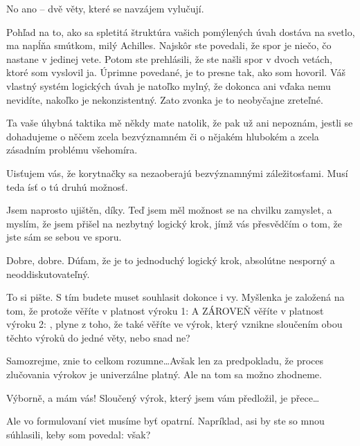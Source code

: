 \documentclass[12pt]{article}
\begin{document}
\begin{description}[itemsep=0pt]
\item[A:] No ano -- dvě věty, které se navzájem vylučují.

\item[Ž:] Pohľad na to, ako sa spletitá štruktúra vašich pomýlených úvah dostáva na 
    svetlo, ma napĺňa smútkom, milý Achilles. Najskôr ste povedali, že spor je niečo, 
    čo nastane v jedinej vete. Potom ste prehlásili, že ste našli spor v dvoch vetách, 
    ktoré som vyslovil ja. Úprimne povedané, je to presne tak, ako som hovoril. 
    Váš vlastný systém logických úvah je natoľko mylný, že dokonca ani vďaka nemu 
    nevidíte, nakoľko je nekonzistentný. Zato zvonka je to neobyčajne zreteľné.

\item[A:] Ta vaše úhybná taktika mě někdy mate natolik, že pak už ani nepoznám,
    jestli se dohadujeme o něčem zcela bezvýznamném či o nějakém hlubokém a zcela
    zásadním problému všehomíra.

\item[Ž:] Uisťujem vás, že korytnačky sa nezaoberajú bezvýznamnými záležitosťami. 
    Musí teda ísť o tú druhú možnosť. 

\item[A:] Jsem naprosto ujištěn, díky. Teď jsem měl možnost se na chvilku
    zamyslet, a myslím, že jsem přišel na nezbytný logický krok, jímž
    vás přesvědčím o tom, že jste sám se sebou ve sporu.

\item[Ž:] Dobre, dobre. Dúfam, že je to jednoduchý logický krok, absolútne 
    nesporný a neoddiskutovateľný.

\item[A:] To si pište. S tím budete muset souhlasit dokonce i vy. Myšlenka
    je založená na tom, že protože věříte v platnost výroku 1:  A ZÁROVEŇ věříte v platnost výroku 2: ,
    plyne z toho, že také věříte ve výrok, který vznikne sloučením obou těchto
    výroků do jedné věty, nebo snad ne?

\item[Ž:] Samozrejme, znie to celkom rozumne\dots Avšak len za predpokladu, 
    že proces zlučovania výrokov je univerzálne platný. Ale na tom sa možno zhodneme.

\item[A:] Výborně, a mám vás! Sloučený výrok, který jsem vám předložil,
    je přece…

\item[Ž:] Ale vo formulovaní viet musíme byť opatrní. Napríklad, asi by ste so 
    mnou súhlasili, keby som povedal:  však?


\end{description}
\end{document}
